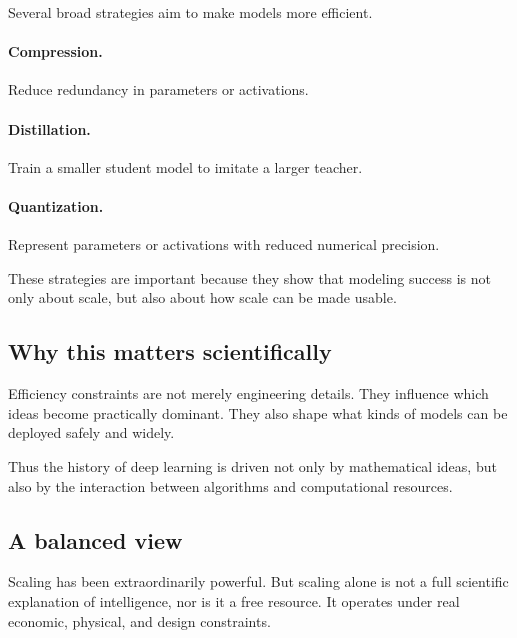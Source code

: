 Several broad strategies aim to make models more efficient.

\paragraph{Compression.}
Reduce redundancy in parameters or activations.

\paragraph{Distillation.}
Train a smaller student model to imitate a larger teacher.

\paragraph{Quantization.}
Represent parameters or activations with reduced numerical precision.

\medskip

These strategies are important because they show that modeling success is not only about scale, but also about how scale can be made usable.

\subsection*{Why this matters scientifically}

Efficiency constraints are not merely engineering details.
They influence which ideas become practically dominant.
They also shape what kinds of models can be deployed safely and widely.

\medskip

Thus the history of deep learning is driven not only by mathematical ideas, but also by the interaction between algorithms and computational resources.

\subsection*{A balanced view}

Scaling has been extraordinarily powerful.
But scaling alone is not a full scientific explanation of intelligence, nor is it a free resource.
It operates under real economic, physical, and design constraints.

